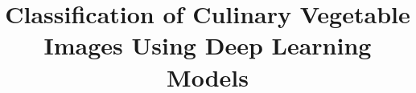 \documentclass[a4paper,fleqn]{cas-sc}
\begin{document}
\let\WriteBookmarks\relax
\def\floatpagepagefraction{1}
\def\textpagefraction{.001}



\title [mode = title]{Classification of Culinary Vegetable Images Using Deep Learning Models}  

\end{document}
